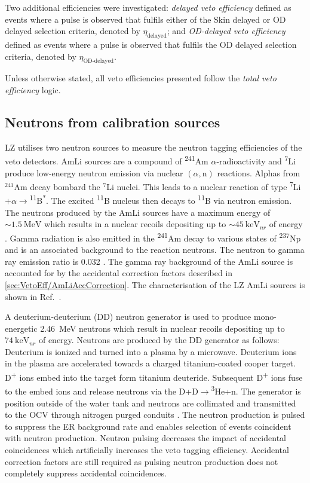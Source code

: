 Two additional efficiencies were investigated: \textit{delayed veto efficiency} defined as events where a pulse is observed that fulfils either of the Skin delayed or OD delayed selection criteria, denoted by $\eta_\text{delayed}$; and \textit{OD-delayed veto efficiency} defined as events where a pulse is observed that fulfils the OD delayed selection criteria, denoted by $\eta_\text{OD-delayed}$.

Unless otherwise stated, all veto efficiencies presented follow the \textit{total veto efficiency} logic.

\subsection{Neutrons from calibration sources}
LZ utilises two neutron sources to measure the neutron tagging efficiencies of the veto detectors. AmLi sources are a compound of \textsuperscript{241}Am $\alpha$-radioactivity and \textsuperscript{7}Li produce low-energy neutron emission via nuclear $(\alpha,\text{n})$ reactions. Alphas from $^{241}$Am decay bombard the $^{7}$Li nuclei. This leads to a nuclear reaction of type \textsuperscript{7}Li$+\alpha \rightarrow$\textsuperscript{11}B\textsuperscript{*}. The excited \textsuperscript{11}B nucleus then decays to \textsuperscript{11}B via neutron emission. The neutrons produced by the AmLi sources have a maximum energy of $\sim1.5~\text{MeV}$ which results in a nuclear recoils depositing up to $\sim45~\text{keV}_{nr}$ of energy \cite{LZ:2024bsz}. Gamma radiation is also emitted in the \textsuperscript{241}Am decay to various states of \textsuperscript{237}Np and is an associated background to the reaction neutrons. The neutron to gamma ray emission ratio is 0.032 \cite{Sazzad:2023uqs}. The gamma ray background of the AmLi source is accounted for by the accidental correction factors described in \autoref{sec:VetoEff/AmLiAccCorrection}. The characterisation of the LZ AmLi sources is shown in Ref.~\cite{Sazzad:2023uqs}.

A deuterium-deuterium (DD) neutron generator is used to produce mono-energetic 2.46~MeV neutrons which result in nuclear recoils depositing up to $74~\text{keV}_{nr}$ of energy. Neutrons are produced by the DD generator as follows: Deuterium is ionized and turned into a plasma by a microwave. Deuterium ions in the plasma are accelerated towards a charged titanium-coated cooper target. D\textsuperscript{+} ions embed into the target form titanium deuteride. Subsequent D\textsuperscript{+} ions fuse to the embed ions and release neutrons via the D+D$\rightarrow$\textsuperscript{3}He+n. The generator is position outside of the water tank and neutrons are collimated and transmitted to the OCV through nitrogen purged conduits \cite{LZ:2024bsz}. The neutron production is pulsed to suppress the ER background rate and enables selection of events coincident with neutron production. Neutron pulsing decreases the impact of accidental coincidences which artificially increases the veto tagging efficiency. Accidental correction factors are still required as pulsing neutron production does not completely suppress accidental coincidences.

